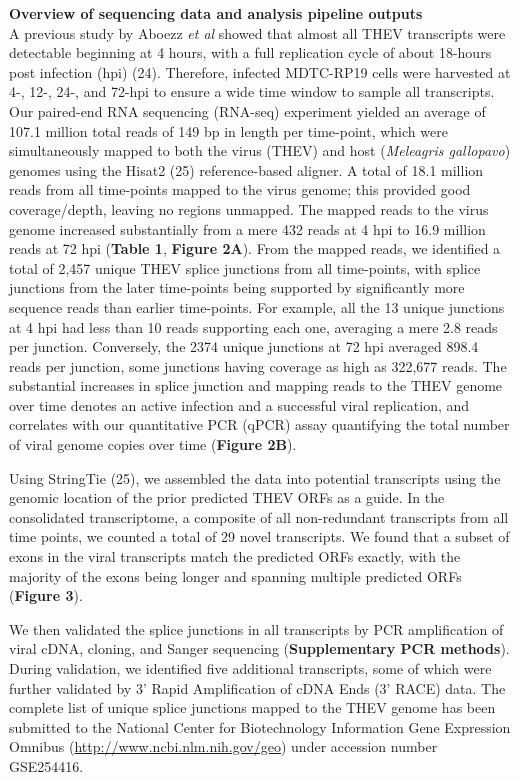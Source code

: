 \documentclass[
]{article}
\begin{document}
\textbf{Overview of sequencing data and analysis pipeline outputs}\\
A previous study by Aboezz \emph{et al} showed that almost all THEV
transcripts were detectable beginning at 4 hours, with a full
replication cycle of about 18-hours post infection (hpi) (24).
Therefore, infected MDTC-RP19 cells were harvested at 4-, 12-, 24-, and
72-hpi to ensure a wide time window to sample all transcripts. Our
paired-end RNA sequencing (RNA-seq) experiment yielded an average of
107.1 million total reads of 149 bp in length per time-point, which were
simultaneously mapped to both the virus (THEV) and host (\emph{Meleagris
gallopavo}) genomes using the Hisat2 (25) reference-based aligner. A
total of 18.1 million reads from all time-points mapped to the virus
genome; this provided good coverage/depth, leaving no regions unmapped.
The mapped reads to the virus genome increased substantially from a mere
432 reads at 4 hpi to 16.9 million reads at 72 hpi (\textbf{Table 1},
\textbf{Figure 2A}). From the mapped reads, we identified a total of
2,457 unique THEV splice junctions from all time-points, with splice
junctions from the later time-points being supported by significantly
more sequence reads than earlier time-points. For example, all the 13
unique junctions at 4 hpi had less than 10 reads supporting each one,
averaging a mere 2.8 reads per junction. Conversely, the 2374 unique
junctions at 72 hpi averaged 898.4 reads per junction, some junctions
having coverage as high as 322,677 reads. The substantial increases in
splice junction and mapping reads to the THEV genome over time denotes
an active infection and a successful viral replication, and correlates
with our quantitative PCR (qPCR) assay quantifying the total number of
viral genome copies over time (\textbf{Figure 2B}).

Using StringTie (25), we assembled the data into potential transcripts
using the genomic location of the prior predicted THEV ORFs as a guide.
In the consolidated transcriptome, a composite of all non-redundant
transcripts from all time points, we counted a total of 29 novel
transcripts. We found that a subset of exons in the viral transcripts
match the predicted ORFs exactly, with the majority of the exons being
longer and spanning multiple predicted ORFs (\textbf{Figure 3}).

We then validated the splice junctions in all transcripts by PCR
amplification of viral cDNA, cloning, and Sanger sequencing
(\textbf{Supplementary PCR methods}). During validation, we identified
five additional transcripts, some of which were further validated by 3'
Rapid Amplification of cDNA Ends (3' RACE) data. The complete list of
unique splice junctions mapped to the THEV genome has been submitted to
the National Center for Biotechnology Information Gene Expression
Omnibus (\url{http://www.ncbi.nlm.nih.gov/geo}) under accession number
GSE254416.
\end{document}
